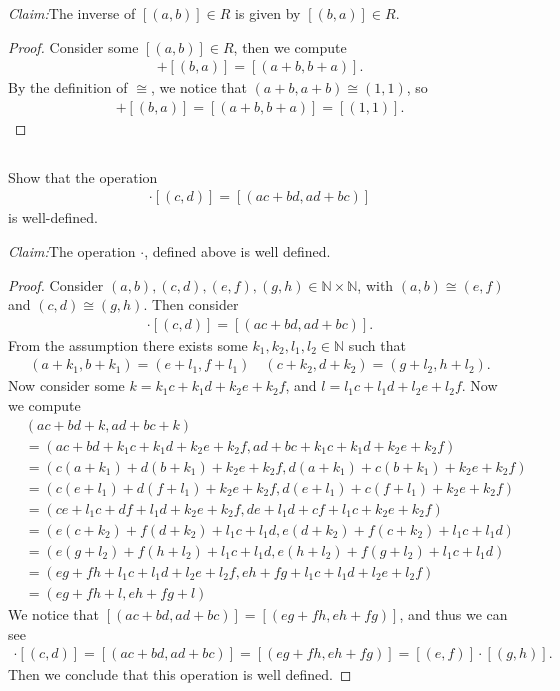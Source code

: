 \documentclass[10pt]{armath}
\newcommand{\N}{\mathbb{N}}
\newenvironment{claim}[1]{\par\noindent\textit{Claim:}\space#1}{}
\begin{document}
\begin{claim}
  The inverse of $[(a,b)]\in R$ is given by $[(b,a)]\in R$.
\end{claim}
\begin{proof}
  Consider some $[(a,b)]\in R$, then we compute
  \begin{align*}
    [(a,b)]+[(b,a)]=[(a+b,b+a)].
  \end{align*}
  By the definition of $\cong$, we notice that $(a+b,a+b)\cong(1,1)$, so
  \begin{align*}
    [(a,b)]+[(b,a)]=[(a+b,b+a)]=[(1,1)].
  \end{align*}
\end{proof}

\subsection{}%
\label{sub:1d}

Show that the operation
\begin{align*}
  [(a,b)]\cdot[(c,d)]=[(ac+bd,ad+bc)]
\end{align*}
is well-defined.

\begin{claim}
  The operation $\cdot$, defined above is well defined.
\end{claim}
\begin{proof}
  Consider $(a,b),(c,d),(e,f),(g,h)\in\N\times\N$, with $(a,b)\cong(e,f)$ and
  $(c,d)\cong(g,h)$. Then consider
  \begin{align*}
    [(a,b)]\cdot[(c,d)]=[(ac+bd,ad+bc)].
  \end{align*}
  From the assumption there exists some $k_1,k_2,l_1,l_2\in\N$ such that
  \begin{align*}
    (a+k_1,b+k_1)=(e+l_1,f+l_1)\quad(c+k_2,d+k_2)=(g+l_2,h+l_2).
  \end{align*}
  Now consider some $k=k_1c+k_1d+k_2e+k_2f$, and $l=l_1c+l_1d+l_2e+l_2f$. Now we compute
  \begin{align*}
    &(ac+bd+k,ad+bc+k)\\
    &=(ac+bd+k_1c+k_1d+k_2e+k_2f,ad+bc+k_1c+k_1d+k_2e+k_2f)\\
    &=(c(a+k_1)+d(b+k_1)+k_2e+k_2f,d(a+k_1)+c(b+k_1)+k_2e+k_2f)\\
    &=(c(e+l_1)+d(f+l_1)+k_2e+k_2f,d(e+l_1)+c(f+l_1)+k_2e+k_2f)\\
    &=(ce+l_1c+df+l_1d+k_2e+k_2f,de+l_1d+cf+l_1c+k_2e+k_2f)\\
    &=(e(c+k_2)+f(d+k_2)+l_1c+l_1d,e(d+k_2)+f(c+k_2)+l_1c+l_1d)\\
    &=(e(g+l_2)+f(h+l_2)+l_1c+l_1d,e(h+l_2)+f(g+l_2)+l_1c+l_1d)\\
    &=(eg+fh+l_1c+l_1d+l_2e+l_2f,eh+fg+l_1c+l_1d+l_2e+l_2f)\\
    &=(eg+fh+l,eh+fg+l)
  \end{align*}
  We notice that $[(ac+bd, ad+bc)]=[(eg+fh,eh+fg)]$, and thus we can see
  \begin{align*}
    [(a,b)]\cdot[(c,d)]=[(ac+bd,ad+bc)]=[(eg+fh,eh+fg)]=[(e,f)]\cdot[(g,h)].
  \end{align*}
  Then we conclude that this operation is well defined.
\end{proof}
\end{document}
